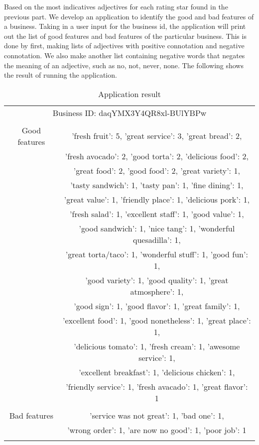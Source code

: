 Based on the most indicatives adjectives for each rating star found in the previous part. We develop an application to identify the good and bad features of a business. Taking in a user input for the business id, the application will print out the list of good features and bad features of the particular business. This is done by first, making lists of adjectives with positive connotation and negative connotation. We also make another list containing negative words that negates the meaning of an adjective, such as no, not, never, none. The following shows the result of running the application.

    \begin{table}
        \centering
        \tiny
        \caption{Application result}
        \begin{tabular}{|c|c|}
            \hline
            \multicolumn{2}{|c|}{Business ID: daqYMX3Y4QR8xl-BUlYBPw}\\
            \multicolumn{2}{|c|}{ }\\
            \hline
            Good features &'fresh fruit': 5, 'great service': 3, 'great bread': 2,\\
            &'fresh avocado': 2, 'good torta': 2, 'delicious food': 2,\\
            &'great food': 2, 'good food': 2, 'great variety': 1,\\
            &'tasty sandwich': 1, 'tasty pan': 1, 'fine dining': 1,\\
            &'great value': 1, 'friendly place': 1, 'delicious pork': 1,\\
            &'fresh salad': 1, 'excellent staff': 1, 'good value': 1,\\
            &'good sandwich': 1, 'nice tang': 1, 'wonderful quesadilla': 1,\\
            &'great torta/taco': 1, 'wonderful stuff': 1, 'good fun': 1,\\
            &'good variety': 1, 'good quality': 1, 'great atmosphere': 1,\\
            &'good sign': 1, 'good flavor': 1, 'great family': 1,\\
            &'excellent food': 1, 'good nonetheless': 1, 'great place': 1,\\
            &'delicious tomato': 1, 'fresh cream': 1, 'awesome service': 1,\\
            &'excellent breakfast': 1, 'delicious chicken': 1,\\
            &'friendly service': 1, 'fresh avacado': 1, 'great flavor': 1\\
            &\\
            \hline
            Bad features &'service was not great': 1, 'bad one': 1,\\
            &'wrong order': 1, 'are now no good': 1, 'poor job': 1\\
            &\\
            \hline
             
        \end{tabular}
    \end{table}

